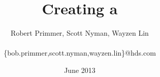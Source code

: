 \title{Creating a \RDOS{}}
\author{Robert Primmer, Scott Nyman, Wayzen Lin \\
  \hds{} \\ \small \{bob.primmer,scott.nyman,wayzen.lin\}@hds.com}
\date{June 2013}
